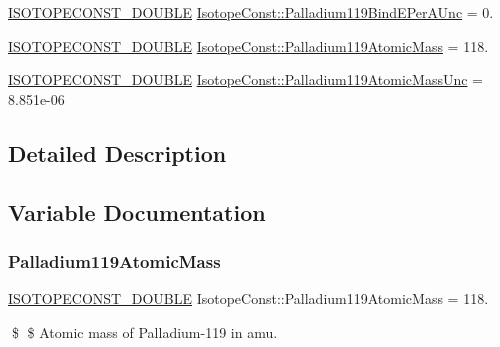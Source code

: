 \begin{DoxyCompactItemize}
\mbox{\hyperlink{group___isotope_const-_macros_ga8f45a7272ce02c0b4c65c44636ed719a}{I\+S\+O\+T\+O\+P\+E\+C\+O\+N\+S\+T\+\_\+\+D\+O\+U\+B\+LE}} \mbox{\hyperlink{group___isotope_const-_palladium-_pd119_ga2e66219ecc596da0a89563719445c87e}{Isotope\+Const\+::\+Palladium119\+Bind\+E\+Per\+A\+Unc}} = 0.
\item 
\mbox{\hyperlink{group___isotope_const-_macros_ga8f45a7272ce02c0b4c65c44636ed719a}{I\+S\+O\+T\+O\+P\+E\+C\+O\+N\+S\+T\+\_\+\+D\+O\+U\+B\+LE}} \mbox{\hyperlink{group___isotope_const-_palladium-_pd119_ga9b1719962c07a9d3d68ab1a5f7d01d21}{Isotope\+Const\+::\+Palladium119\+Atomic\+Mass}} = 118.
\item 
\mbox{\hyperlink{group___isotope_const-_macros_ga8f45a7272ce02c0b4c65c44636ed719a}{I\+S\+O\+T\+O\+P\+E\+C\+O\+N\+S\+T\+\_\+\+D\+O\+U\+B\+LE}} \mbox{\hyperlink{group___isotope_const-_palladium-_pd119_gac5c2fddfebccf43065f5a124eee7a016}{Isotope\+Const\+::\+Palladium119\+Atomic\+Mass\+Unc}} = 8.\+851e-\/06
\end{DoxyCompactItemize}


\subsection{Detailed Description}


\subsection{Variable Documentation}
\mbox{\label{group___isotope_const-_palladium-_pd119_ga9b1719962c07a9d3d68ab1a5f7d01d21}} 
\subsubsection{\texorpdfstring{Palladium119\+Atomic\+Mass}{Palladium119AtomicMass}}
{\footnotesize\ttfamily \mbox{\hyperlink{group___isotope_const-_macros_ga8f45a7272ce02c0b4c65c44636ed719a}{I\+S\+O\+T\+O\+P\+E\+C\+O\+N\+S\+T\+\_\+\+D\+O\+U\+B\+LE}} Isotope\+Const\+::\+Palladium119\+Atomic\+Mass = 118.}

\$ \$ Atomic mass of Palladium-\/119 in amu. \mbox{\label{group___isotope_const-_palladium-_pd119_gac5c2fddfebccf43065f5a124eee7a016}} 
